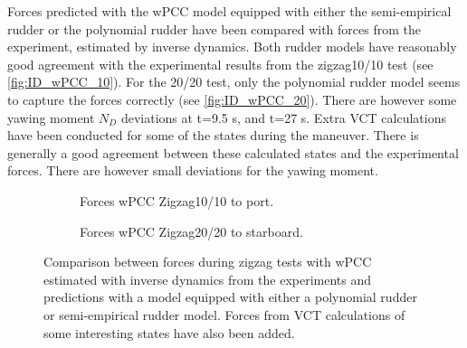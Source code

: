 Forces predicted with the wPCC model equipped with either the semi-empirical rudder or the polynomial rudder have been compared with forces from the experiment, estimated by inverse dynamics. Both rudder models have reasonably good agreement with the experimental results from the zigzag10/10 test (see \autoref{fig:ID_wPCC_10}). For the 20/20 test, only the polynomial rudder model seems to capture the forces correctly (see \autoref{fig:ID_wPCC_20}). There are however some yawing moment $N_D$ deviations at t=9.5 s, and t=27 s. Extra VCT calculations have been conducted for some of the states during the maneuver. There is generally a good agreement between these calculated states and the experimental forces. There are however small deviations for the yawing moment.  
\begin{figure}[h]
     \centering
     \begin{subfigure}[b]{\textwidth}
         \centering
         
        \caption{Forces wPCC Zigzag10/10 to port.}
        \label{fig:ID_wPCC_10}
     \end{subfigure}
     \vfill
     \begin{subfigure}[b]{\textwidth}
         
        \caption{Forces wPCC Zigzag20/20 to starboard.}
        \label{fig:ID_wPCC_20}
     \end{subfigure}
        \caption{Comparison between forces during zigzag tests with wPCC estimated with inverse dynamics from the experiments and predictions with a model equipped with either a polynomial rudder or semi-empirical rudder model. Forces from VCT calculations of some interesting states have also been added.}
        \label{fig:ID_wPCC}
\end{figure}        